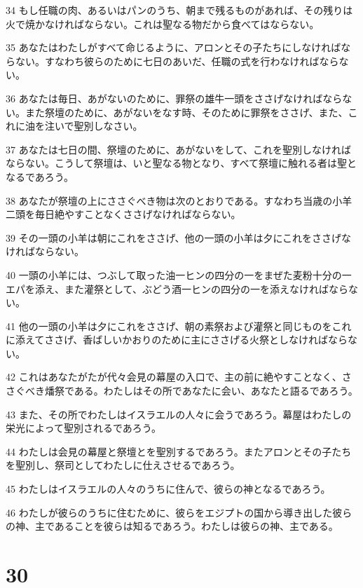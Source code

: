 \par 34 もし任職の肉、あるいはパンのうち、朝まで残るものがあれば、その残りは火で焼かなければならない。これは聖なる物だから食べてはならない。
\par 35 あなたはわたしがすべて命じるように、アロンとその子たちにしなければならない。すなわち彼らのために七日のあいだ、任職の式を行わなければならない。
\par 36 あなたは毎日、あがないのために、罪祭の雄牛一頭をささげなければならない。また祭壇のために、あがないをなす時、そのために罪祭をささげ、また、これに油を注いで聖別しなさい。
\par 37 あなたは七日の間、祭壇のために、あがないをして、これを聖別しなければならない。こうして祭壇は、いと聖なる物となり、すべて祭壇に触れる者は聖となるであろう。
\par 38 あなたが祭壇の上にささぐべき物は次のとおりである。すなわち当歳の小羊二頭を毎日絶やすことなくささげなければならない。
\par 39 その一頭の小羊は朝にこれをささげ、他の一頭の小羊は夕にこれをささげなければならない。
\par 40 一頭の小羊には、つぶして取った油一ヒンの四分の一をまぜた麦粉十分の一エパを添え、また灌祭として、ぶどう酒一ヒンの四分の一を添えなければならない。
\par 41 他の一頭の小羊は夕にこれをささげ、朝の素祭および灌祭と同じものをこれに添えてささげ、香ばしいかおりのために主にささげる火祭としなければならない。
\par 42 これはあなたがたが代々会見の幕屋の入口で、主の前に絶やすことなく、ささぐべき燔祭である。わたしはその所であなたに会い、あなたと語るであろう。
\par 43 また、その所でわたしはイスラエルの人々に会うであろう。幕屋はわたしの栄光によって聖別されるであろう。
\par 44 わたしは会見の幕屋と祭壇とを聖別するであろう。またアロンとその子たちを聖別し、祭司としてわたしに仕えさせるであろう。
\par 45 わたしはイスラエルの人々のうちに住んで、彼らの神となるであろう。
\par 46 わたしが彼らのうちに住むために、彼らをエジプトの国から導き出した彼らの神、主であることを彼らは知るであろう。わたしは彼らの神、主である。

\chapter{30}

